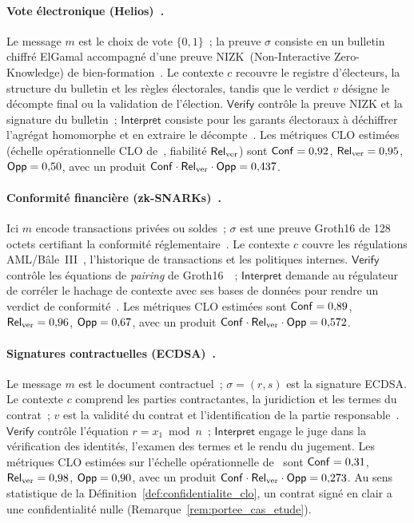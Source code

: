 \begin{sloppypar}
\paragraph{Vote \'electronique (Helios)~\cite{Adida08,Adida09UCL}.}
Le message $m$ est le choix de vote $\{0,1\}$~; la preuve $\sigma$
consiste en un bulletin chiffr\'e ElGamal accompagn\'e d'une preuve NIZK~(Non-Interactive Zero-Knowledge)
de bien-formation~\cite{Chaum81,CramerDamgardSchoenmakers}. Le contexte $c$ recouvre le registre d'\'electeurs,
la structure du bulletin et les r\`egles \'electorales, tandis que le
verdict $v$ d\'esigne le d\'ecompte final ou la validation de l'\'election.
$\mathsf{Verify}$ contr\^ole la preuve NIZK et la signature du bulletin~;
$\mathsf{Interpret}$ consiste pour les garants \'electoraux \`a d\'echiffrer
l'agr\'egat homomorphe et en extraire le d\'ecompte~\cite{Goodman15}. Les m\'etriques CLO
estim\'ees (\'echelle op\'erationnelle CLO de~\cite{MINKA2026CLO}, fiabilit\'e
$\mathsf{Rel}_{\mathrm{ver}}$) sont $\mathsf{Conf} = 0{,}92$, $\mathsf{Rel}_{\mathrm{ver}} = 0{,}95$, $\mathsf{Opp} = 0{,}50$, avec
un produit $\mathsf{Conf}\cdot\mathsf{Rel}_{\mathrm{ver}}\cdot\mathsf{Opp} = 0{,}437$.

\paragraph{Conformit\'e financi\`ere (zk-SNARKs)~\cite{Groth16,BCTV14,Gennaro13,Parno13}.}
Ici $m$ encode transactions priv\'ees ou soldes~; $\sigma$ est une preuve
Groth16 de 128 octets certifiant la conformit\'e r\'eglementaire~\cite{BenSasson2019,PLONK20}. Le contexte
$c$ couvre les r\'egulations AML/B\^ale~III~\cite{BaselIII}, l'historique de
transactions et les politiques internes. $\mathsf{Verify}$ contr\^ole les
\'equations de \emph{pairing} de Groth16~\cite{Campanelli2019,Wahby18}~; $\mathsf{Interpret}$ demande au
r\'egulateur de corr\'eler le hachage de contexte avec ses bases de donn\'ees
pour rendre un verdict de conformit\'e~\cite{FATF15}. Les m\'etriques CLO estim\'ees sont
$\mathsf{Conf} = 0{,}89$, $\mathsf{Rel}_{\mathrm{ver}} = 0{,}96$, $\mathsf{Opp} = 0{,}67$, avec un produit
$\mathsf{Conf}\cdot\mathsf{Rel}_{\mathrm{ver}}\cdot\mathsf{Opp} = 0{,}572$.

\paragraph{Signatures contractuelles (ECDSA)~\cite{Johnson01,NIST.FIPS.186-5}.}
Le message $m$ est le document contractuel~; $\sigma = (r, s)$ est la
signature ECDSA. Le contexte $c$ comprend les parties contractantes, la
juridiction et les termes du contrat~; $v$ est la validit\'e du contrat et
l'identification de la partie responsable~\cite{Mason07,Kerr04}. $\mathsf{Verify}$ contr\^ole
l'\'equation $r = x_1 \bmod n$~; $\mathsf{Interpret}$ engage le juge dans
la v\'erification des identit\'es, l'examen des termes et le rendu du jugement.
Les m\'etriques CLO estim\'ees sur l'\'echelle op\'erationnelle de~\cite{MINKA2026CLO} sont
$\mathsf{Conf} = 0{,}31$, $\mathsf{Rel}_{\mathrm{ver}} = 0{,}98$, $\mathsf{Opp} = 0{,}90$, avec un produit $\mathsf{Conf}\cdot\mathsf{Rel}_{\mathrm{ver}}\cdot\mathsf{Opp} = 0{,}273$.
Au sens statistique de la D\'efinition~\ref{def:confidentialite_clo}, un contrat sign\'e en clair a
une confidentialit\'e nulle (Remarque~\ref{rem:portee_cas_etude}).


\end{sloppypar}
